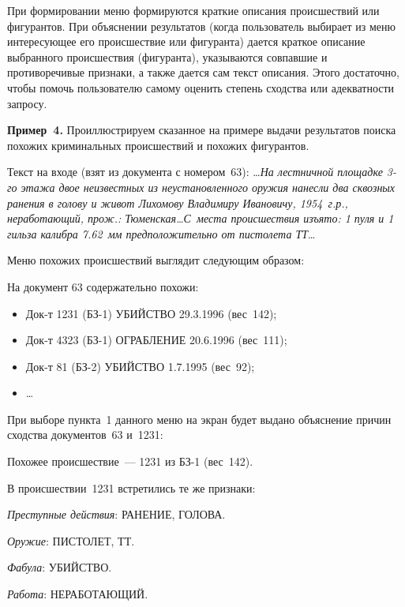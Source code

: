 \begin{multicols}{2}
    При формировании меню формируются краткие описания происшествий 
или фигурантов. При объяснении результатов (когда пользователь выбирает из 
меню интересующее его происшествие или фигуранта) дается краткое описание 
выбранного происшествия (фигуранта), указываются совпавшие и 
противоречивые признаки, а также дается сам текст описания. Этого 
достаточно, чтобы помочь пользователю самому оценить степень сходства или 
адекватности запросу.
    
    \medskip
    
    \noindent
    \textbf{Пример~4.} Проиллюстрируем сказанное на примере выдачи 
результатов поиска похожих криминальных происшествий и похожих 
фигурантов.
    
    Текст на входе (взят из документа с номером~63):
    \ldots\textit{На лестничной площадке 3-го этажа двое неизвестных из 
неустановленного оружия нанесли два сквозных ранения в голову и живот 
Лихомову Владимиру Ивановичу, 1954~г.р., неработающий, прож.: 
Тюменская\ldots С~места происшествия изъято: 1 пуля и 1 гильза калибра 
7.62~мм предположительно от пистолета ТТ}\ldots
    
    Меню похожих происшествий выглядит следующим образом:
    
     На документ 63 содержательно похожи:
     \begin{itemize}
     \item Док-т 1231 (БЗ-1) УБИЙСТВО 29.3.1996 (вес~142);
     \item Док-т 4323 (БЗ-1) ОГРАБЛЕНИЕ 20.6.1996 (вес~111);
     \item Док-т 81 (БЗ-2) УБИЙСТВО 1.7.1995 (вес~92);
     \item \ldots
     \end{itemize}
    
    При выборе пункта~1 данного меню на экран будет выдано объяснение 
причин сходства документов~63 и~1231:

         Похожее происшествие~--- 1231 из БЗ-1 (вес~142).
         
         В происшествии~1231 встретились те же приз\-наки:
         \pagebreak
         
     
     \textit{Преступные действия}: РАНЕНИЕ, ГОЛОВА.
     
     \textit{Оружие}: ПИСТОЛЕТ, ТТ.
     
     \textit{Фабула}: УБИЙСТВО.
     
     \textit{Работа}: НЕРАБОТАЮЩИЙ.
     

\end{multicols}
